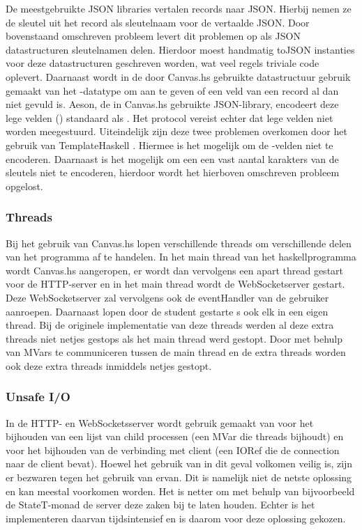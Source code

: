 De meestgebruikte JSON libraries vertalen records naar JSON. Hierbij nemen ze de sleutel uit het record als sleutelnaam voor de vertaalde JSON. Door bovenstaand omschreven probleem levert dit problemen op als JSON datastructuren sleutelnamen delen. Hierdoor moest handmatig toJSON instanties voor deze datastructuren geschreven worden, wat veel regels triviale code oplevert. Daarnaast wordt in de door Canvas.hs gebruikte datastructuur gebruik gemaakt van het -datatype om aan te geven of een veld van een record al dan niet gevuld is. Aeson, de in Canvas.hs gebruikte JSON-library, encodeert deze lege velden () standaard als . Het protocol vereist echter dat lege velden niet worden meegestuurd. Uiteindelijk zijn deze twee problemen overkomen door het gebruik van TemplateHaskell \cite{AesonTH}. Hiermee is het mogelijk om de -velden niet te encoderen. Daarnaast is het mogelijk om een een vast aantal karakters van de sleutels niet te encoderen, hierdoor wordt het hierboven omschreven probleem opgelost. 


\subsubsection{Threads}
Bij het gebruik van Canvas.hs lopen verschillende threads om verschillende delen van het programma af te handelen. In het main thread van het haskellprogramma wordt Canvas.hs aangeropen, er wordt dan vervolgens een apart thread gestart voor de HTTP-server en in het main \mbox{thread} wordt de WebSocketserver gestart. Deze WebSocketserver zal vervolgens ook de eventHandler van de gebruiker aanroepen. Daarnaast lopen door de student gestarte s ook elk in een eigen \mbox{thread}. Bij de originele implementatie van deze threads werden al deze extra threads niet netjes gestops als het main thread werd gestopt. Door met behulp van MVars te communiceren tussen de main thread en de extra threads worden ook deze extra threads inmiddels netjes gestopt.

\subsubsection{Unsafe I/O}
In de HTTP- en WebSocketsserver wordt gebruik gemaakt van  voor het bijhouden van een lijst van child processen (een MVar die threads bijhoudt) en voor het bijhouden van de verbinding met client (een IORef die de connection naar de client bevat). Hoewel het gebruik van  in dit geval volkomen veilig is, zijn er bezwaren tegen het gebruik van ervan\cite{Haskell.org2008}. Dit is namelijk niet de netste oplossing en kan meestal voorkomen worden. Het is netter om met behulp van bijvoorbeeld de StateT-monad de server deze zaken bij te laten houden. Echter is het implementeren daarvan tijdsintensief en is daarom voor deze oplossing gekozen.